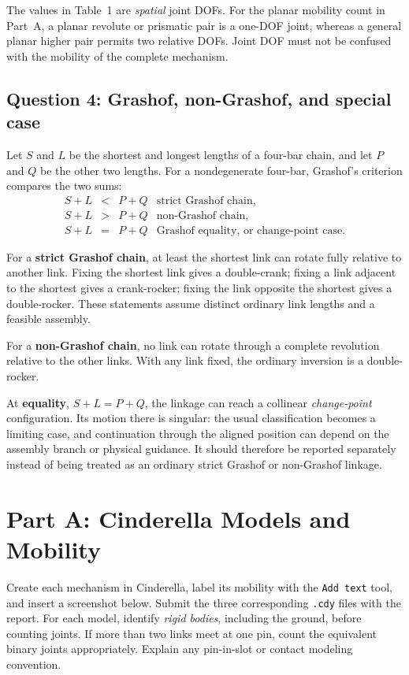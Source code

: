 \documentclass[11pt,a4paper]{article}
\begin{document}
The values in Table~1 are \emph{spatial} joint DOFs. For the planar mobility
count in Part~A, a planar revolute or prismatic pair is a one-DOF joint,
whereas a general planar higher pair permits two relative DOFs. Joint DOF
must not be confused with the mobility of the complete mechanism.

\subsection{Question 4: Grashof, non-Grashof, and special case}
Let $S$ and $L$ be the shortest and longest lengths of a four-bar chain,
and let $P$ and $Q$ be the other two lengths. For a nondegenerate four-bar,
Grashof's criterion compares the two sums:
\begin{equation}
  \begin{array}{rcll}
    S+L &<& P+Q & \text{strict Grashof chain},\\
    S+L &>& P+Q & \text{non-Grashof chain},\\
    S+L &=& P+Q & \text{Grashof equality, or change-point case}.
  \end{array}
  \label{eq:grashof}
\end{equation}

For a \textbf{strict Grashof chain}, at least the shortest link can rotate
fully relative to another link. Fixing the shortest link gives a
double-crank; fixing a link adjacent to the shortest gives a crank-rocker;
fixing the link opposite the shortest gives a double-rocker. These statements
assume distinct ordinary link lengths and a feasible assembly.

For a \textbf{non-Grashof chain}, no link can rotate through a complete
revolution relative to the other links. With any link fixed, the ordinary
inversion is a double-rocker.

At \textbf{equality}, $S+L=P+Q$, the linkage can reach a collinear
\emph{change-point} configuration. Its motion there is singular: the usual
classification becomes a limiting case, and continuation through the
aligned position can depend on the assembly branch or physical guidance.
It should therefore be reported separately instead of being treated as an
ordinary strict Grashof or non-Grashof linkage.

\section{Part A: Cinderella Models and Mobility}
Create each mechanism in Cinderella, label its mobility with the
\texttt{Add text} tool, and insert a screenshot below. Submit the three
corresponding \texttt{.cdy} files with the report. For each model, identify
\emph{rigid bodies}, including the ground, before counting joints. If more
than two links meet at one pin, count the equivalent binary joints
appropriately. Explain any pin-in-slot or contact modeling convention.
\end{document}
